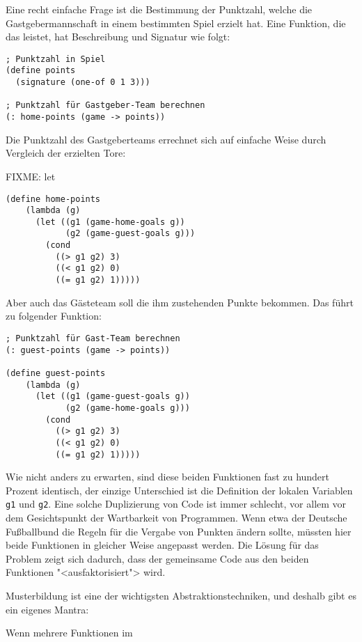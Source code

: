 Eine recht einfache Frage ist die Bestimmung der Punktzahl, welche die
Gastgebermannschaft in einem bestimmten Spiel erzielt hat. Eine Funktion, die
das leistet, hat Beschreibung und Signatur wie
folgt:

\begin{verbatim}
; Punktzahl in Spiel
(define points
  (signature (one-of 0 1 3)))

; Punktzahl für Gastgeber-Team berechnen
(: home-points (game -> points))
\end{verbatim}
Die Punktzahl des Gastgeberteams errechnet sich auf einfache Weise durch
Vergleich der erzielten Tore:

FIXME: let

\begin{verbatim}
(define home-points
    (lambda (g)
      (let ((g1 (game-home-goals g))
            (g2 (game-guest-goals g)))
        (cond
          ((> g1 g2) 3)
          ((< g1 g2) 0)
          ((= g1 g2) 1)))))
\end{verbatim}
Aber auch das Gästeteam soll die ihm zustehenden Punkte bekommen. Das führt zu
folgender Funktion:
\begin{verbatim}
; Punktzahl für Gast-Team berechnen
(: guest-points (game -> points))

(define guest-points
    (lambda (g)
      (let ((g1 (game-guest-goals g))
            (g2 (game-home-goals g)))
        (cond
          ((> g1 g2) 3)
          ((< g1 g2) 0)
          ((= g1 g2) 1)))))
\end{verbatim}
Wie nicht anders zu erwarten, sind diese beiden Funktionen fast zu hundert
Prozent identisch, der einzige Unterschied ist die Definition der lokalen
Variablen \texttt{g1} und \texttt{g2}. Eine solche Duplizierung von Code ist
immer schlecht, vor allem vor dem Gesichtspunkt der Wartbarkeit von
Programmen. Wenn etwa der Deutsche Fußballbund die Regeln für die Vergabe von
Punkten ändern sollte, müssten hier beide Funktionen in gleicher Weise
angepasst werden.  Die Lösung für das Problem zeigt sich dadurch, dass der
gemeinsame Code aus den beiden Funktionen "<ausfaktorisiert"> wird. 

Musterbildung ist eine der wichtigsten Abstraktionstechniken, und deshalb gibt
es ein eigenes Mantra:

\begin{mantra}\label{mantra:abstraction} Wenn mehrere Funktionen im
  
\end{mantra}

